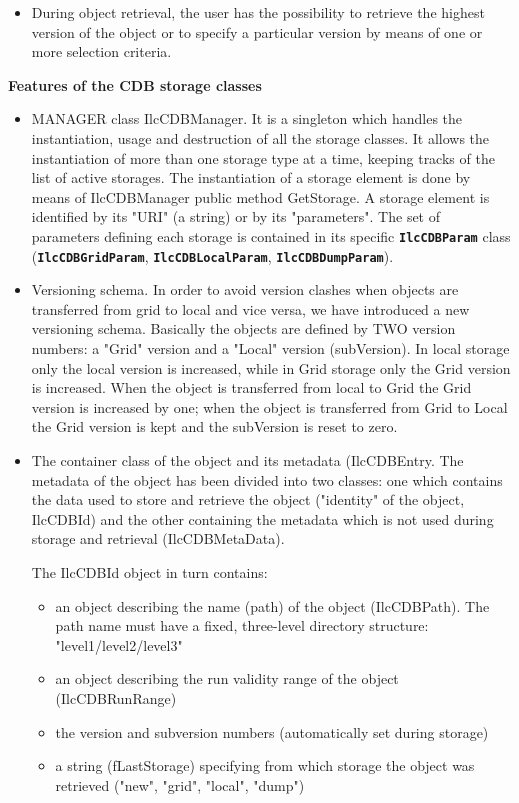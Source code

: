 \documentclass[12pt,a4paper,twoside]{article}
\newcommand{\class}[1]{\texttt{\textbf{#1}}\xspace}
\begin{document}
{\begin{itemize}
\item During object retrieval, the user has the possibility to retrieve the 
  highest version of the object or to specify a particular version by means 
  of one or more selection criteria.
\end{itemize} 

\noindent
\textbf{Features of the CDB storage classes}


\begin{itemize}
\item MANAGER class IlcCDBManager. It is a singleton which handles 
  the instantiation, usage and destruction of all the storage classes. It 
  allows the instantiation of more than one storage type at a time, keeping 
  tracks of the list of active storages. The instantiation of a storage 
  element is done by means of IlcCDBManager public method GetStorage. A 
  storage element is identified by its "URI" (a string) or by its 
  "parameters". The set of parameters defining each storage is contained in 
  its specific \class{IlcCDBParam} class (\class{IlcCDBGridParam}, \class{IlcCDBLocalParam}, 
  \class{IlcCDBDumpParam}).
  
\item Versioning schema. In order to avoid version clashes when objects 
  are transferred from grid to local and vice versa, we have introduced a 
  new versioning schema. Basically the objects are defined by TWO version 
  numbers: a "Grid" version and a "Local" version (subVersion). In local 
  storage only the local version is increased, while in Grid storage only 
  the Grid version is increased. When the object is transferred from local 
  to Grid the Grid version is increased by one; when the object is 
  transferred from Grid to Local the Grid version is kept and the subVersion 
  is reset to zero. %
  
\item The container class of the object and its metadata
  (IlcCDBEntry. The metadata of the object has been divided into two  
  classes: one which contains the data used to store and retrieve the object 
  ("identity" of the object, IlcCDBId) and the other containing the metadata 
  which is not used during storage and retrieval (IlcCDBMetaData). 

  The IlcCDBId object in turn contains:
  \begin{itemize}
  \item an object describing the name (path) of the object (IlcCDBPath). The 
    path name must have a fixed, three-level directory structure: 
    "level1/level2/level3" 
  \item an object describing the run validity range of the object
    (IlcCDBRunRange)
  \item the version and subversion numbers (automatically set during storage)
  \item a string (fLastStorage) specifying from which storage the object was 
    retrieved ("new", "grid", "local", "dump")
  \end{itemize}
  

\end{itemize}}
\end{document}
